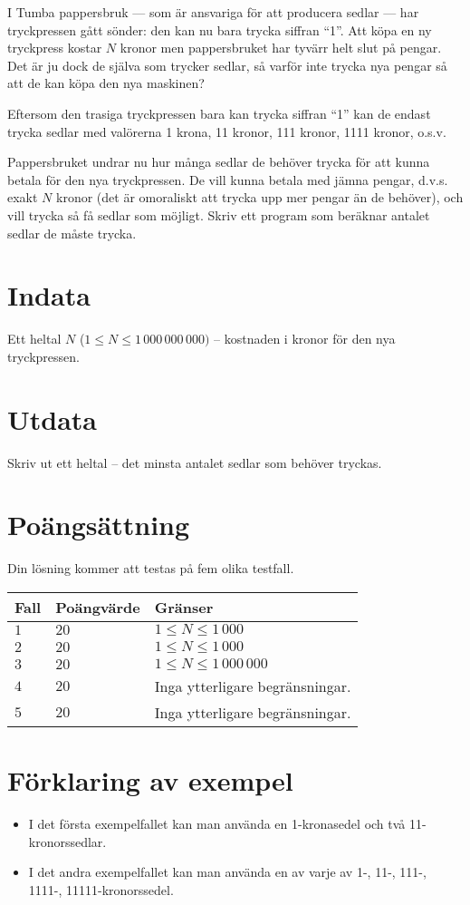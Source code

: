 I Tumba pappersbruk --- som är ansvariga för att producera sedlar --- har tryckpressen gått sönder: den kan nu bara trycka siffran ``1''.
Att köpa en ny tryckpress kostar $N$ kronor men pappersbruket har tyvärr helt slut på pengar.
Det är ju dock de själva som trycker sedlar, så varför inte trycka nya pengar så att de kan köpa den nya maskinen?

Eftersom den trasiga tryckpressen bara kan trycka siffran ``1'' kan de endast trycka sedlar med valörerna 1 krona, 11 kronor, 111 kronor, 1111 kronor, o.s.v.

Pappersbruket undrar nu hur många sedlar de behöver trycka för att kunna betala för den nya tryckpressen.
De vill kunna betala med jämna pengar, d.v.s. exakt $N$ kronor (det är omoraliskt att trycka upp mer pengar än de behöver), och vill trycka så få sedlar som möjligt.
Skriv ett program som beräknar antalet sedlar de måste trycka.

\section*{Indata}
Ett heltal $N$ ($1 \le N \le 1\,000\,000\,000)$ -- kostnaden i kronor för den nya tryckpressen.

\section*{Utdata}
Skriv ut ett heltal -- det minsta antalet sedlar som behöver tryckas.

\section*{Poängsättning}
Din lösning kommer att testas på fem olika testfall.

\noindent
\begin{tabular}{| l | l | l |}
  \hline
  Fall & Poängvärde & Gränser \\ \hline
  $1$    & $20$        &  $1 \le N \le 1\,000$ \\ \hline 
  $2$    & $20$        &  $1 \le N \le 1\,000$ \\ \hline 
  $3$    & $20$        &  $1 \le N \le 1\,000\,000$ \\ \hline
  $4$    & $20$        &  Inga ytterligare begränsningar. \\ \hline
  $5$    & $20$        &  Inga ytterligare begränsningar. \\ \hline
\end{tabular}

\section*{Förklaring av exempel}
\begin{itemize}
  \item I det första exempelfallet kan man använda en 1-kronasedel och två 11-kronorssedlar.
  \item I det andra exempelfallet kan man använda en av varje av 1-, 11-, 111-, 1111-, 11111-kronorssedel.
\end{itemize}
